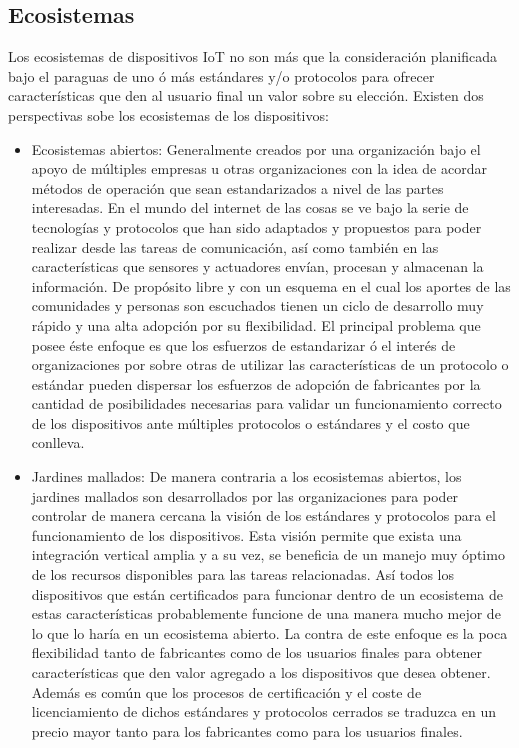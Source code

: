 \subsection{Ecosistemas}
Los ecosistemas de dispositivos IoT no son más que la consideración planificada bajo el paraguas de uno ó más estándares y/o protocolos para ofrecer características que den al usuario final un valor sobre su elección. Existen dos perspectivas sobe los ecosistemas de los dispositivos: 
\begin{itemize}
\item Ecosistemas abiertos: Generalmente creados por una organización bajo el apoyo de múltiples empresas u otras organizaciones con la idea de acordar métodos de operación que sean estandarizados a nivel de las partes interesadas. En el mundo del internet de las cosas se ve bajo la serie de tecnologías y protocolos que han sido adaptados y propuestos para poder realizar desde las tareas de comunicación, así como también en las características que sensores y actuadores envían, procesan y almacenan la información. De propósito libre y con un esquema en el cual los aportes de las comunidades y personas son escuchados tienen un ciclo de desarrollo muy rápido y una alta adopción por su flexibilidad. El principal problema que posee éste enfoque es que los esfuerzos de estandarizar ó el interés de organizaciones por sobre otras de utilizar las características  de un protocolo o estándar pueden dispersar los esfuerzos de adopción de fabricantes por la cantidad de posibilidades necesarias para validar un funcionamiento correcto de los dispositivos ante múltiples protocolos o estándares y el costo que conlleva. 
\item Jardines mallados: De manera contraria a los ecosistemas abiertos, los jardines mallados son desarrollados por las organizaciones para poder controlar de manera cercana la visión de los estándares y protocolos para el funcionamiento de los dispositivos. Esta visión permite que exista una integración vertical amplia y a su vez, se beneficia de un manejo muy óptimo de los recursos disponibles para las tareas relacionadas. Así todos los dispositivos que están certificados para funcionar dentro de un ecosistema de estas características probablemente funcione de una manera mucho mejor de lo que lo haría en un ecosistema abierto. La contra de este enfoque es la poca flexibilidad tanto de fabricantes como de los usuarios finales para obtener características que den valor agregado a los dispositivos que desea obtener\cite{iotInternetSociety}. Además es común que los procesos de certificación y el coste de licenciamiento de dichos estándares y protocolos cerrados se traduzca en un precio mayor tanto para los fabricantes como para los usuarios finales.
\end{itemize}

